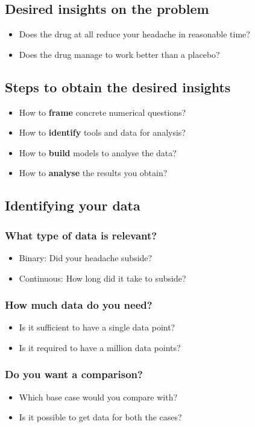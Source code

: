 \documentclass[11pt]{article}
\begin{document}
\subsection{Desired insights on the problem}
\label{sec:org6c98123}
\begin{itemize}
\item Does the drug at all reduce your headache in reasonable time?
\item Does the drug manage to work better than a placebo?
\end{itemize}
\subsection{Steps to obtain the desired insights}
\label{sec:org435b1a6}
\begin{itemize}
\item How to \textbf{frame} concrete numerical questions?
\item How to \textbf{identify} tools and data for analysis?
\item How to \textbf{build} models to analyse the data?
\item How to \textbf{analyse} the results you obtain?
\end{itemize}
\subsection{Identifying your data}
\label{sec:orgc37e2c9}

\subsubsection{What type of data is relevant?}
\label{sec:orge0db5b5}
\begin{itemize}
\item Binary: Did your headache subside?
\item Continuous: How long did it take to subside?
\end{itemize}
\subsubsection{How much data do you need?}
\label{sec:orgc3aed60}
\begin{itemize}
\item Is it sufficient to have a single data point?
\item Is it required to have a million data points?
\end{itemize}
\subsubsection{Do you want a comparison?}
\label{sec:orgfaa1721}
\begin{itemize}
\item Which base case would you compare with?
\item Is it possible to get data for both the cases?
\end{itemize}
\end{document}
